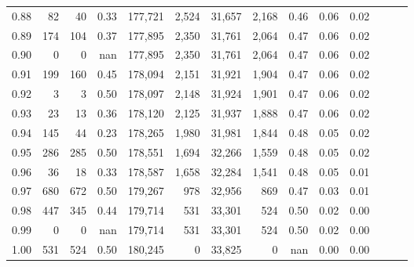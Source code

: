 \begin{tabular}{rrrrrrrrrrrrrr}
0.88 &      82 &     40 &  0.33 &  177,721 &    2,524 &  31,657 &   2,168 &  0.46 &  0.06 &      0.02 \\
0.89 &     174 &    104 &  0.37 &  177,895 &    2,350 &  31,761 &   2,064 &  0.47 &  0.06 &      0.02 \\
0.90 &       0 &      0 &   nan &  177,895 &    2,350 &  31,761 &   2,064 &  0.47 &  0.06 &      0.02 \\
0.91 &     199 &    160 &  0.45 &  178,094 &    2,151 &  31,921 &   1,904 &  0.47 &  0.06 &      0.02 \\
0.92 &       3 &      3 &  0.50 &  178,097 &    2,148 &  31,924 &   1,901 &  0.47 &  0.06 &      0.02 \\
0.93 &      23 &     13 &  0.36 &  178,120 &    2,125 &  31,937 &   1,888 &  0.47 &  0.06 &      0.02 \\
0.94 &     145 &     44 &  0.23 &  178,265 &    1,980 &  31,981 &   1,844 &  0.48 &  0.05 &      0.02 \\
0.95 &     286 &    285 &  0.50 &  178,551 &    1,694 &  32,266 &   1,559 &  0.48 &  0.05 &      0.02 \\
0.96 &      36 &     18 &  0.33 &  178,587 &    1,658 &  32,284 &   1,541 &  0.48 &  0.05 &      0.01 \\
0.97 &     680 &    672 &  0.50 &  179,267 &      978 &  32,956 &     869 &  0.47 &  0.03 &      0.01 \\
0.98 &     447 &    345 &  0.44 &  179,714 &      531 &  33,301 &     524 &  0.50 &  0.02 &      0.00 \\
0.99 &       0 &      0 &   nan &  179,714 &      531 &  33,301 &     524 &  0.50 &  0.02 &      0.00 \\
1.00 &     531 &    524 &  0.50 &  180,245 &        0 &  33,825 &       0 &   nan &  0.00 &      0.00 \\
\bottomrule
\end{tabular}

